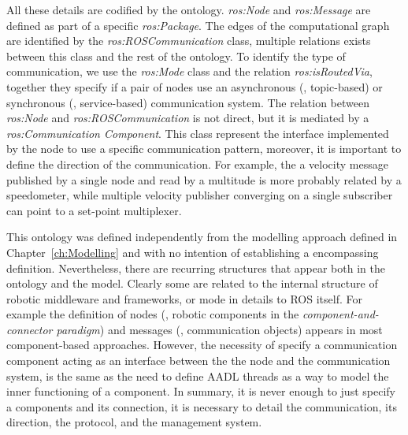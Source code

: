 All these details are codified by the ontology. \textit{ros:Node} and \textit{ros:Message} are defined as part of a specific \textit{ros:Package}. The edges of the computational graph are identified by the \textit{ros:ROS\-Com\-mu\-ni\-ca\-tion} class, multiple relations exists between this class and the rest of the ontology. To identify the type of communication, we use the \textit{ros:Mode} class and the relation \textit{ros:isRoutedVia}, together they specify if a pair of nodes use an asynchronous (\ie, topic-based) or synchronous (\ie, service-based) communication system. The relation between \textit{ros:Node} and \textit{ros:ROS\-Com\-mu\-ni\-ca\-tion} is not direct, but it is mediated by a \textit{ros:Communication Component}. This class represent the interface implemented by the node to use a specific communication pattern, moreover, it is important to define the direction of the communication. For example, the a velocity message published by a single node and read by a multitude is more probably related by a speedometer, while multiple velocity publisher converging on a single subscriber can point to a set-point multiplexer.

This ontology was defined independently from the modelling approach defined in Chapter~\ref{ch:Modelling} and with no intention of establishing a encompassing definition. Nevertheless, there are recurring structures that appear both in the ontology and the  model. Clearly some are related to the internal structure of robotic middleware and frameworks, or mode in details to ROS itself. For example the definition of nodes (\ie, robotic components in the \textit{component-and-connector paradigm}) and messages (\ie, communication objects) appears in most component-based approaches. However, the necessity of specify a communication component acting as an interface between the the node and the communication system, is the same as the need to define AADL threads as a way to model the inner functioning of a component. In summary, it is never enough to just specify a components and its connection, it is necessary to detail the communication, its direction, the protocol, and the management system.

